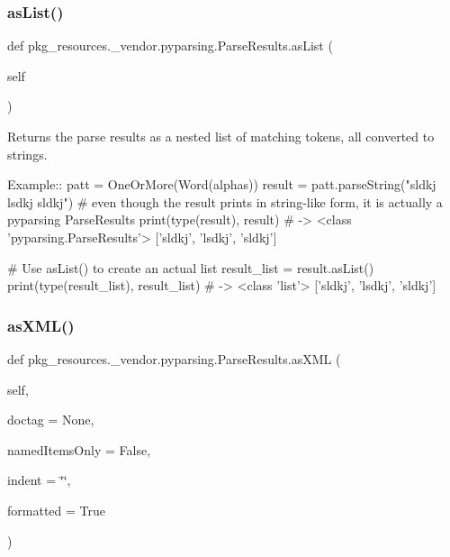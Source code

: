 \subsubsection{\texorpdfstring{as\+List()}{asList()}}
{\footnotesize\ttfamily def pkg\+\_\+resources.\+\_\+vendor.\+pyparsing.\+Parse\+Results.\+as\+List (\begin{DoxyParamCaption}\item[{}]{self }\end{DoxyParamCaption})}

\begin{DoxyVerb}Returns the parse results as a nested list of matching tokens, all converted to strings.

Example::
    patt = OneOrMore(Word(alphas))
    result = patt.parseString("sldkj lsdkj sldkj")
    # even though the result prints in string-like form, it is actually a pyparsing ParseResults
    print(type(result), result) # -> <class 'pyparsing.ParseResults'> ['sldkj', 'lsdkj', 'sldkj']
    
    # Use asList() to create an actual list
    result_list = result.asList()
    print(type(result_list), result_list) # -> <class 'list'> ['sldkj', 'lsdkj', 'sldkj']
\end{DoxyVerb}
 \mbox{\label{classpkg__resources_1_1__vendor_1_1pyparsing_1_1ParseResults_a5a6a33bef33c1cd43437358783fdffde}} 
\subsubsection{\texorpdfstring{as\+X\+M\+L()}{asXML()}}
{\footnotesize\ttfamily def pkg\+\_\+resources.\+\_\+vendor.\+pyparsing.\+Parse\+Results.\+as\+X\+ML (\begin{DoxyParamCaption}\item[{}]{self,  }\item[{}]{doctag = {\ttfamily None},  }\item[{}]{named\+Items\+Only = {\ttfamily False},  }\item[{}]{indent = {\ttfamily \char`\"{}\char`\"{}},  }\item[{}]{formatted = {\ttfamily True} }\end{DoxyParamCaption})}

